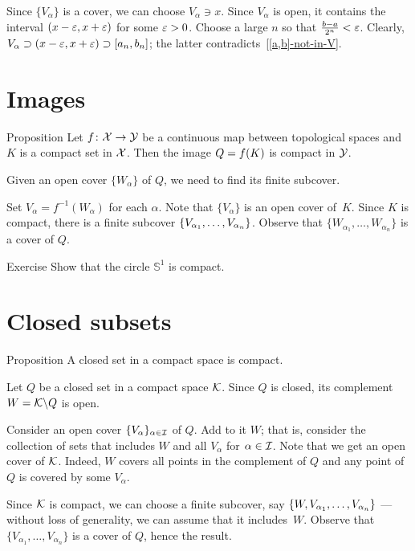 Since $\{V_\alpha\}$ is a cover, we can choose $V_\alpha\ni x$.
Since $V_\alpha$ is open, it contains the interval $(x-\varepsilon,x+\varepsilon)$ for some $\varepsilon>0$.
Choose a large $n$ so that $\tfrac{b-a}{2^n}<\varepsilon$.
Clearly, $V_\alpha\supset (x-\varepsilon,x+\varepsilon)\supset[a_n,b_n]$;
the latter contradicts~\ref{[a,b]-not-in-V}.\qeds



\section{Images}

\begin{thm}{Proposition}
Let $f\colon\mathcal{X}\to\mathcal{Y}$ be a continuous map between topological spaces and $K$ is a compact set in $\mathcal{X}$.
Then the image $Q\z=f(K)$ is compact in $\mathcal{Y}$.
\end{thm}

Given an open cover $\{W_\alpha\}$ of $Q$, we need to find its finite subcover.

Set $V_\alpha=f^{-1}(W_\alpha)$ for each $\alpha$.
Note that $\{V_\alpha\}$ is an open cover of~$K$.
Since $K$ is compact, there is a finite subcover $\{V_{\alpha_1},\z\dots, V_{\alpha_n}\}$.
Observe that $\{W_{\alpha_1},\dots, W_{\alpha_n}\}$ is a cover of $Q$.
\qeds

\begin{thm}{Exercise}
Show that the circle $\mathbb{S}^1$ is compact.
\end{thm}

\section{Closed subsets}

\begin{thm}{Proposition} 
A closed set in a compact space is compact.
\end{thm}

Let $Q$ be a closed set in a compact space $\mathcal{K}$.
Since $Q$ is closed, its complement $W=\mathcal{K}\backslash Q$ is open.

Consider an open cover $\{V_\alpha\}_{\alpha\in\mathcal{I}}$ of $Q$.
Add to it $W$; that is, consider the collection of sets that includes $W$ and all $V_\alpha$ for $\alpha\in\mathcal{I}$.
Note that we get an open cover of $\mathcal{K}$.
Indeed, $W$ covers all points in the complement of $Q$ and any point of $Q$ is covered by some $V_\alpha$.

Since $\mathcal{K}$ is compact, we can choose a finite subcover, say $\{W,V_{\alpha_1},\z\dots,V_{\alpha_n}\}$ --- without loss of generality, we can assume that it includes~$W$.
Observe that $\{V_{\alpha_1},\dots,V_{\alpha_n}\}$ is a cover of $Q$, hence the result.
\qeds

